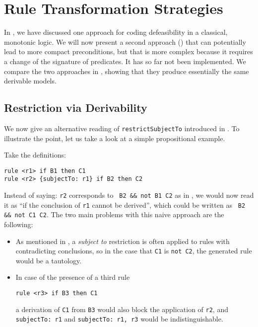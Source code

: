 \section{Rule Transformation Strategies}\label{sec:rule_transformation_strategies}

In , we have discussed one
approach for coding defeasibility in a classical, monotonic logic. We will now
present a second approach () that can potentially lead to more compact
preconditions, but that is more complex because it requires a change of the
signature of predicates. It has so far not been implemented. We compare the
two approaches in , showing that they produce
essentially the same derivable models.

\subsection{Restriction via Derivability}\label{sec:restr_deriv}

We now give an alternative reading of \texttt{restrictSubjectTo} introduced in
. To
illustrate the point, let us take a look at a simple propositional example.

\begin{example}\label{ex:small_propositional} Take the definitions:
\begin{lstlisting}
rule <r1> if B1 then C1
rule <r2> {subjectTo: r1} if B2 then C2
\end{lstlisting}
\end{example}

Instead of saying: \texttt{r2} corresponds to
\texttt{ B2 \&\& not B1  C2} 
as in , we would now read it as
``if the conclusion of \texttt{r1} cannot be derived'', 
which could be written as
\texttt{ B2 \&\& not C1  C2}.
The two main problems with this naive approach are the following:
\begin{itemize}
\item As mentioned in , a \emph{subject to}
  restriction is often applied to rules with contradicting conclusions, so in
  the case that \texttt{C1} is \texttt{not C2}, the generated rule would be a
  tautology.
\item In case of the presence of a third rule
\begin{lstlisting}[frame=none]
rule <r3> if B3 then C1
\end{lstlisting}
a derivation of \texttt{C1} from \texttt{B3} would also block the application
of \texttt{r2}, and \texttt{subjectTo: r1} and \texttt{subjectTo: r1, r3}
would be indistinguishable.
\end{itemize}

